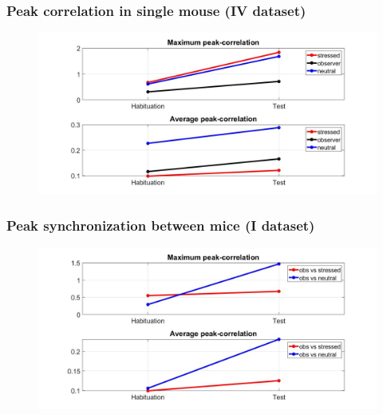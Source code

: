 \documentclass{beamer}
\begin{document}
\begin{frame}
\frametitle{Peak correlation in single mouse (IV dataset)}


\begin{figure}[H]
	\begin{center}
		\hspace*{-1.3cm}
		\includegraphics[scale=.30]{peak_corr4.jpg} 
	\end{center}  
	
	
\end{figure}

\end{frame}

\begin{frame}
\frametitle{Peak synchronization between mice (I dataset)}


\begin{figure}[H]
	\begin{center}
		\hspace*{-1.3cm}
		\includegraphics[scale=.30]{peak_synch.jpg} 
	\end{center}  
	
	
\end{figure}

\end{frame}
\end{document}
